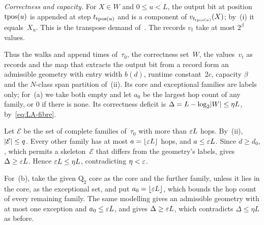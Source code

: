 \begin{outline}
\emph{Correctness and capacity.} For $X\in W$ and $0\le u<L$, the output bit at position $\operatorname{tpos}(u)$ is appended at step
$t_{\operatorname{tpos}(u)}$ and is a component of $v_{t_{\operatorname{tpos}(u)}}(X)$; by~(i) it equals~$X_u$. This is the transpose demand
of~\cite[Section~2.1]{SourceCovers2026}. The records $v_t$ take at most $2^\beta$ values.

Thus the walks and append times of~$\tau_0$, the correctness set~$W$, the values~$v_t$ as records and the map that
extracts the output bit from a record form an admissible geometry with entry width $b(d)$, runtime constant~$2c$, capacity
$\beta$ and the $N$-class span partition of~(ii). Its core and exceptional families are labels only; for~(a) we take both
empty and let $a_0$ be the largest hop count of any family, or $0$ if there is none. Its correctness deficit is
$\Delta=L-\log_2\lvert W \rvert\le\eta L$, by~\eqref{eq:LA-fibre}.

Let $\mathcal E$ be the set of complete families of~$\tau_0$ with more than $\varepsilon L$ hops. By~(ii), $\lvert \mathcal E \rvert\le q$.
Every other family has at most $a=\lfloor\varepsilon L\rfloor$ hops, and $a\le\varepsilon L$. Since $d\ge d_0$,
\cite[Corollary~4.5]{SourceCovers2026}, which permits a skeleton~$\mathcal E$ that differs from the geometry's labels,
gives $\Delta\ge\varepsilon L$. Hence $\varepsilon L\le\eta L$, contradicting $\eta<\varepsilon$.

For~(b), take the given $\mathrm Q_2$ core as the core and the further family, unless it lies in the core, as the
exceptional set, and put $a_0=\lfloor\varepsilon L\rfloor$, which bounds the hop count of every remaining family. The same
modelling gives an admissible geometry with at most one exception and $a_0\le\varepsilon L$, and
\cite[Corollary~4.3]{SourceCovers2026} gives $\Delta\ge\varepsilon L$, which contradicts $\Delta\le\eta L$ as before.


\end{outline}
